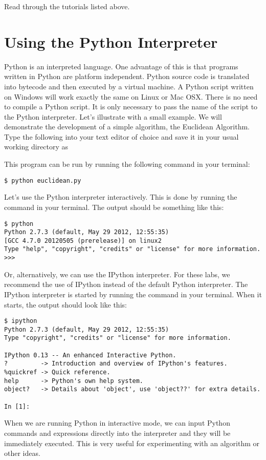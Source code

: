 \begin{problem}
Read through the tutorials listed above.
\end{problem}

\section*{Using the Python Interpreter}
Python is an interpreted language.
One advantage of this is that programs written in Python are platform independent. 
Python source code is translated into bytecode and then executed by a virtual machine.
A Python script written on Windows will work exactly the same on Linux or Mac OSX.
There is no need to compile a Python script.
It is only necessary to pass the name of the script to the Python interpreter. 
Let's illustrate with a small example.
We will demonstrate the development of a simple algorithm, the Euclidean Algorithm.
Type the following into your text editor of choice and save it in your usual working directory as 


This program can be run by running the following command in your terminal:

\begin{lstlisting}
$ python euclidean.py
\end{lstlisting}

Let's use the Python interpreter interactively.
This is done by running the command  in your terminal.
The output should be something like this:
\begin{lstlisting}
$ python
Python 2.7.3 (default, May 29 2012, 12:55:35) 
[GCC 4.7.0 20120505 (prerelease)] on linux2
Type "help", "copyright", "credits" or "license" for more information.
>>> 
\end{lstlisting}
Or, alternatively, we can use the IPython interpreter.  
For these labs, we recommend the use of IPython instead of the default Python interpreter.
The IPython interpreter is started by running the command  in your terminal.
When it starts, the output should look like this:
\begin{lstlisting}
$ ipython
Python 2.7.3 (default, May 29 2012, 12:55:35) 
Type "copyright", "credits" or "license" for more information.

IPython 0.13 -- An enhanced Interactive Python.
?         -> Introduction and overview of IPython's features.
%quickref -> Quick reference.
help      -> Python's own help system.
object?   -> Details about 'object', use 'object??' for extra details.

In [1]: 
\end{lstlisting}
When we are running Python in interactive mode, we can input Python commands and expressions directly into the interpreter and they will be immediately executed. 
This is very useful for experimenting with an algorithm or other ideas.

